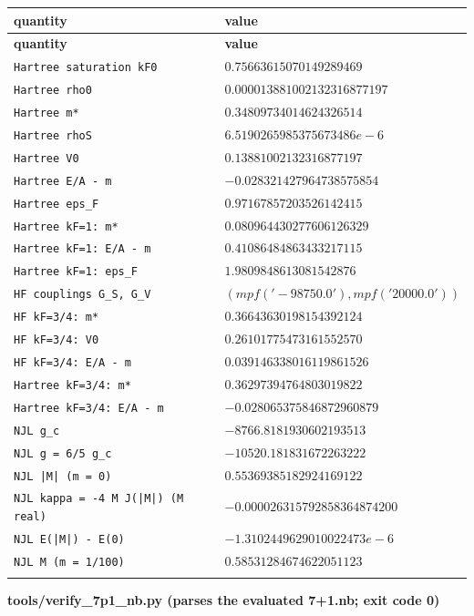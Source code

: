 \documentclass[10pt,a4paper]{article}
\begin{document}
{\footnotesize
\begin{longtable}{>{\raggedright\arraybackslash}p{}>{\raggedright\arraybackslash}p{}}
\toprule
\textbf{quantity} & \textbf{value} \\
\midrule\endfirsthead
\toprule
\textbf{quantity} & \textbf{value} \\
\midrule\endhead
\endfoot
\bottomrule\endlastfoot
\texttt{Hartree saturation kF0} & $0.75663615070149289469$ \\
\texttt{Hartree rho0} & $0.000013881002132316877197$ \\
\texttt{Hartree m*} & $0.34809734014624326514$ \\
\texttt{Hartree rhoS} & $6.5190265985375673486e-6$ \\
\texttt{Hartree V0} & $0.13881002132316877197$ \\
\texttt{Hartree E/\allowbreak{}A - m} & $-0.028321427964738575854$ \\
\texttt{Hartree eps\_\allowbreak{}F} & $0.97167857203526142415$ \\
\texttt{Hartree kF=1: m*} & $0.080964430277606126329$ \\
\texttt{Hartree kF=1: E/\allowbreak{}A - m} & $0.41086484863433217115$ \\
\texttt{Hartree kF=1: eps\_\allowbreak{}F} & $1.9809848613081542876$ \\
\texttt{HF couplings G\_\allowbreak{}S, G\_\allowbreak{}V} & $(mpf('-98750.0'), mpf('20000.0'))$ \\
\texttt{HF kF=3/\allowbreak{}4: m*} & $0.36643630198154392124$ \\
\texttt{HF kF=3/\allowbreak{}4: V0} & $0.26101775473161552570$ \\
\texttt{HF kF=3/\allowbreak{}4: E/\allowbreak{}A - m} & $0.039146338016119861526$ \\
\texttt{Hartree kF=3/\allowbreak{}4: m*} & $0.36297394764803019822$ \\
\texttt{Hartree kF=3/\allowbreak{}4: E/\allowbreak{}A - m} & $-0.028065375846872960879$ \\
\texttt{NJL g\_\allowbreak{}c} & $-8766.8181930602193513$ \\
\texttt{NJL g = 6/\allowbreak{}5 g\_\allowbreak{}c} & $-10520.181831672263222$ \\
\texttt{NJL |M| (m = 0)} & $0.55369385182924169122$ \\
\texttt{NJL kappa = -4 M J(|M|) (M real)} & $-0.000026315792858364874200$ \\
\texttt{NJL E(|M|) - E(0)} & $-1.3102449629010022473e-6$ \\
\texttt{NJL M (m = 1/\allowbreak{}100)} & $0.58531284674622051123$ \\*
\end{longtable}}
\textbf{tools/verify\_7p1\_nb.py (parses the evaluated 7+1.nb; exit code 0)}
\end{document}
